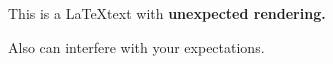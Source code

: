 This is a \LaTeX text with \bf{unexpected} rendering.

Also \centering can interfere with your expectations.
